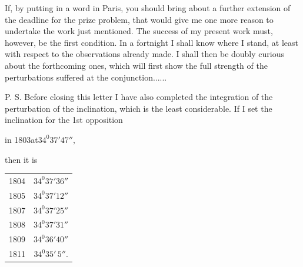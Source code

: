 \par
\noindent\hspace*{\parindent}If, by putting in a word in Paris, you should bring about a further extension of the deadline for the prize problem, that would give me one more reason to undertake the work just mentioned. The success of my present work must, however, be the first condition. In a fortnight I shall know where I stand, at least with respect to the observations already made. I shall then be doubly curious about the forthcoming ones, which will first show the full strength of the perturbations suffered at the conjunction.\quad.\quad.\quad.\quad.\quad.
\par
\noindent\hspace*{\parindent}P. S. Before closing this letter I have also completed the integration of the perturbation of the inclination, which is the least considerable. If I set the inclination for the 1st opposition
\begin{center}in 1803\quad at\quad \(34^{0}37'47'',\)\end{center}
then it is
\begin{center}
\begin{tabular}{lc}
1804 & \(34^{0}37'36''\)\\
1805 & \(34^{0}37'12''\)\\
1807 & \(34^{0}37'25''\)\\
1808 & \(34^{0}37'31''\)\\
1809 & \(34^{0}36'40''\)\\
1811 & \(34^{0}35'\,5''.\)\\
\end{tabular}
\end{center}
\par
